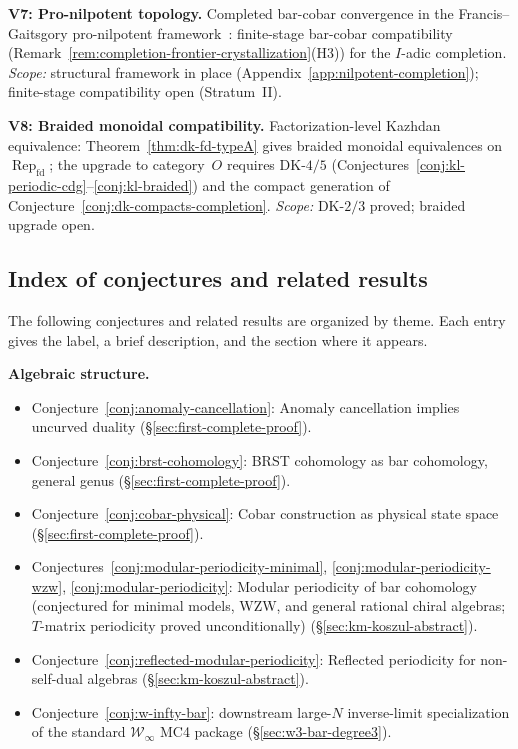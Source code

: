 \begin{remark}
\smallskip
\noindent\textbf{V7: Pro-nilpotent topology.}
Completed bar-cobar convergence in the Francis--Gaitsgory pro-nilpotent
framework~\cite{FG12}: finite-stage bar-cobar compatibility
(Remark~\ref{rem:completion-frontier-crystallization}(H3)) for the
$I$-adic completion.
\emph{Scope:} structural framework in place
(Appendix~\ref{app:nilpotent-completion}); finite-stage compatibility
open (Stratum~II).

\smallskip
\noindent\textbf{V8: Braided monoidal compatibility.}
Factorization-level Kazhdan equivalence:
Theorem~\ref{thm:dk-fd-typeA} gives braided monoidal equivalences
on $\operatorname{Rep}_{\mathrm{fd}}$; the upgrade to category~$O$
requires DK-$4/5$ (Conjectures~\ref{conj:kl-periodic-cdg}--\ref{conj:kl-braided}) and the compact generation of
Conjecture~\ref{conj:dk-compacts-completion}.
\emph{Scope:} DK-$2/3$ proved; braided upgrade open.
\end{remark}


\subsection{Index of conjectures and related results}\label{sec:conjecture-index}

The following conjectures and related results are organized by theme.
Each entry gives the label, a brief description,
and the section where it appears.

\smallskip
\noindent\textbf{Algebraic structure.}

\begin{itemize}[nosep]
\item Conjecture~\ref{conj:anomaly-cancellation}:
  Anomaly cancellation implies uncurved duality
  (\S\ref{sec:first-complete-proof}).
\item Conjecture~\ref{conj:brst-cohomology}:
  BRST cohomology as bar cohomology, general genus
  (\S\ref{sec:first-complete-proof}).
\item Conjecture~\ref{conj:cobar-physical}:
  Cobar construction as physical state space
  (\S\ref{sec:first-complete-proof}).
\item Conjectures~\ref{conj:modular-periodicity-minimal},
  \ref{conj:modular-periodicity-wzw},
  \ref{conj:modular-periodicity}:
  Modular periodicity of bar cohomology (conjectured for
  minimal models, WZW, and general rational chiral algebras;
  $T$-matrix periodicity proved unconditionally)
  (\S\ref{sec:km-koszul-abstract}).
\item Conjecture~\ref{conj:reflected-modular-periodicity}:
  Reflected periodicity for non-self-dual algebras
  (\S\ref{sec:km-koszul-abstract}).
\item Conjecture~\ref{conj:w-infty-bar}:
  downstream large-$N$ inverse-limit specialization of the standard
  $\mathcal{W}_\infty$ MC4 package
  (\S\ref{sec:w3-bar-degree3}).
\end{itemize}

